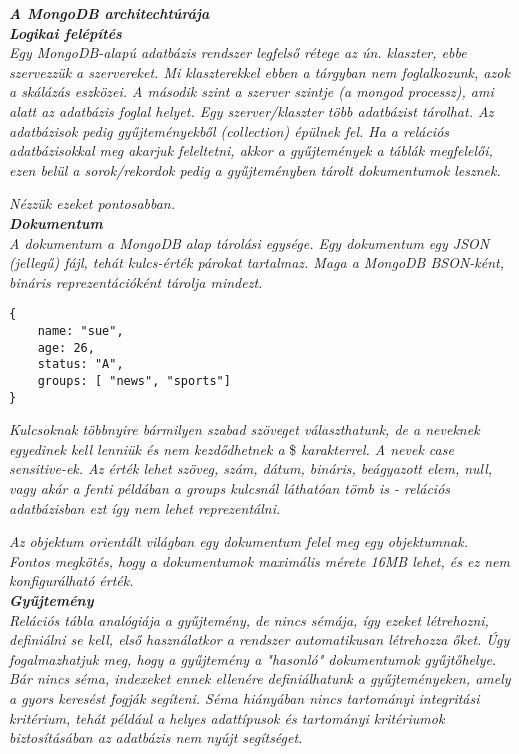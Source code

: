 \noindent\textit{\textbf{\large{A MongoDB architechtúrája}}}\\

\noindent\textit{\textbf{Logikai felépítés}}\\

\textit{Egy MongoDB-alapú adatbázis rendszer legfelső rétege az ún. klaszter, ebbe szervezzük a szervereket. Mi klaszterekkel ebben a tárgyban nem foglalkozunk, azok a skálázás eszközei. A második szint a szerver szintje (a mongod processz), ami alatt az adatbázis foglal helyet. Egy szerver/klaszter több adatbázist tárolhat. Az adatbázisok pedig gyűjteményekből (collection) épülnek fel. Ha a relációs adatbázisokkal meg akarjuk feleltetni, akkor a gyűjtemények a táblák megfelelői, ezen belül a sorok/rekordok pedig a gyűjteményben tárolt dokumentumok lesznek.}

\textit{Nézzük ezeket pontosabban.}\\

\noindent\textit{\textbf{Dokumentum}}\\

\textit{A dokumentum a MongoDB alap tárolási egysége. Egy dokumentum egy JSON (jellegű) fájl, tehát kulcs-érték párokat tartalmaz. Maga a MongoDB BSON-ként, bináris reprezentációként tárolja mindezt.}


\begin{verbatim}
{
    name: "sue",
    age: 26,
    status: "A",
    groups: [ "news", "sports"]
}
\end{verbatim}

\textit{Kulcsoknak többnyire bármilyen szabad szöveget választhatunk, de a neveknek egyedinek kell lenniük és nem kezdődhetnek a} \${} \textit{karakterrel. A nevek case sensitive-ek. Az érték lehet szöveg, szám, dátum, bináris, beágyazott elem, null, vagy akár a fenti példában a groups kulcsnál láthatóan tömb is - relációs adatbázisban ezt így nem lehet reprezentálni.}

\textit{Az objektum orientált világban egy dokumentum felel meg egy objektumnak. Fontos megkötés, hogy a dokumentumok maximális mérete 16MB lehet, és ez nem konfigurálható érték.}\\

\noindent\textit{\textbf{Gyűjtemény}}\\

\textit{Relációs tábla analógiája a gyűjtemény, de nincs sémája, így ezeket létrehozni, definiálni se kell, első használatkor a rendszer automatikusan létrehozza őket. Úgy fogalmazhatjuk meg, hogy a gyűjtemény a "hasonló" dokumentumok gyűjtőhelye. Bár nincs séma, indexeket ennek ellenére definiálhatunk a gyűjteményeken, amely a gyors keresést fogják segíteni. Séma hiányában nincs tartományi integritási kritérium, tehát például a helyes adattípusok és tartományi kritériumok biztosításában az adatbázis nem nyújt segítséget.}\\

